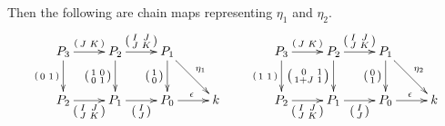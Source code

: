 \documentclass[12pt]{article}
\begin{document}
Then the following are chain maps representing $\eta_1$ and $\eta_2$.
\begin{equation}\label{eta12}
\vcenter{\begin{xy}\xymatrix{
P_3\ar[r]^{\left(\begin{smallmatrix}J&K\end{smallmatrix}\right)}
\ar[d]_{\left(\begin{smallmatrix}0&1\end{smallmatrix}\right)}
&P_2\ar[r]^{\left(\begin{smallmatrix}I&J\\J&K\end{smallmatrix}\right)}
\ar[d]_{\left(\begin{smallmatrix}1&0\\0&1\end{smallmatrix}\right)}
&P_1\ar[rd]^{\eta_1}
\ar[d]_{\left(\begin{smallmatrix}1\\0\end{smallmatrix}\right)}\\
P_2\ar[r]_{\left(\begin{smallmatrix}I&J\\J&K\end{smallmatrix}\right)}
&P_1\ar[r]_{\left(\begin{smallmatrix}I\\J\end{smallmatrix}\right)}
&P_0\ar[r]^\epsilon
&k
}\end{xy}}\qquad
\vcenter{\begin{xy}\xymatrix{
P_3\ar[r]^{\left(\begin{smallmatrix}J&K\end{smallmatrix}\right)}
\ar[d]_{\left(\begin{smallmatrix}1&1\end{smallmatrix}\right)}
&P_2\ar[r]^{\left(\begin{smallmatrix}I&J\\J&K\end{smallmatrix}\right)}
\ar[d]_{\left(\begin{smallmatrix}0&1\\1+J&1\end{smallmatrix}\right)}
&P_1\ar[rd]^{\eta_2}
\ar[d]_{\left(\begin{smallmatrix}0\\1\end{smallmatrix}\right)}\\
P_2\ar[r]_{\left(\begin{smallmatrix}I&J\\J&K\end{smallmatrix}\right)}
&P_1\ar[r]_{\left(\begin{smallmatrix}I\\J\end{smallmatrix}\right)}
&P_0\ar[r]^\epsilon
&k
}\end{xy}}
\end{equation}
\end{document}
